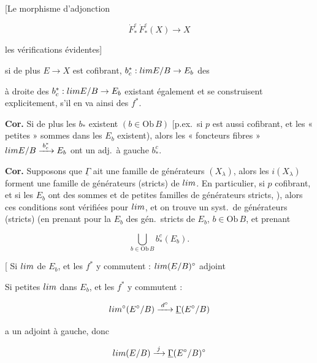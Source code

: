 \documentclass[11pt,a4paper]{article}
\begin{document}
[Le morphisme d'adjonction

\[ \dot{F}^{\varepsilon}_{*}\,\dot{F}^{\varepsilon}_{*}(X) \longrightarrow X \]

\ill{} les vérifications évidentes]

\ill{} si de plus $E \to X$ est cofibrant, \ill{} $b^{*}_{c} : \varprojlim E/B
\to E_{b}$ \ill{} des  \ill{}

\ill{} à droite des $b^{*}_{c} : \varprojlim E/B \to E_{b}$ existant également
et se construisent explicitement, s'il en va ainsi des $f^{*}$.


\textbf{Cor.} Si de plus les $b_{*}$ existent $(b \in \mathrm{Ob}\,B)$ [p.ex.\
si $p$ est aussi cofibrant, et les « petites » sommes dans les $E_{b}$
existent), alors les \struck{\ill{}} « foncteurs fibres » $\varprojlim E/B
\xrightarrow{\;b^{*}_{c}\;} E_{b}$ ont un adj.\ à gauche $b^{c}_{*}$.

\textbf{Cor.} Supposons que $\underline{\Gamma}$ ait une famille de
générateurs \add{stricts} $(X_{\lambda})$, alors les $i(X_{\lambda})$ forment
une famille de générateurs (stricts) de $\varprojlim$. En particulier, si $p$
cofibrant, et si les $E_{b}$ ont des \add{petites} sommes et de petites
familles de générateurs stricts, ),
alors ces conditions sont vérifiées pour $\varprojlim$, et on trouve un syst.\
de générateurs (stricts) (en prenant pour la \ill{} $E_{b}$ des gén.\ stricts
de $E_{b}$, $b \in \mathrm{Ob}\,B$, et prenant

\[ \bigcup_{b \in \mathrm{Ob}\,B} b^{c}_{*}(E_{b}). \]


[ Si $\varinjlim$  \ill{} de $E_{b}$, et les $f^{*}$ y commutent :
$\varprojlim(E/B)^{\circ}$ \ill{} adjoint \ill{}

Si petites $\varprojlim$ \ill{} dans $E_{b}$, et les $f^{*}$ y commutent :

\[ \varprojlim{}^{\circ}(E^{\circ}/B) \xrightarrow{\;d^{\circ}\;}
   \underline{\Gamma}(E^{\circ}/B) \]

a un adjoint à gauche, donc

\[ \varprojlim(E/B) \xrightarrow{\;j\;}
   \underline{\Gamma}(E^{\circ}/B)^{\circ} \]
\end{document}

